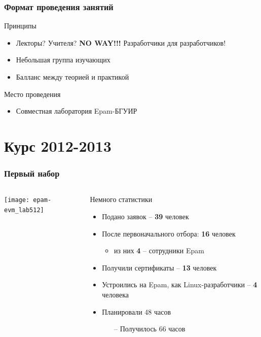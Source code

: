 \begin{frame}
	\frametitle{Формат проведения занятий}

	\begin{block}{Принципы}
		\begin{itemize}
			\item Лекторы? Учителя? {\bf NO WAY!!!} \newline 
				Разработчики для разработчиков! 
			\item Небольшая группа изучающих
			\item Балланс между теорией и практикой
		\end{itemize}
	\end{block}

	\begin{block}{Место проведения}
		\begin{itemize}
			\item Совместная лаборатория Epam-БГУИР 
		\end{itemize}
	\end{block}

\end{frame}

\section[2012]{Курс 2012-2013}

\begin{frame}
  \frametitle{Первый набор}
  \begin{columns}
	\texttt{[image: epam-evm\_lab512]}

	\begin{block}{Немного статистики}
		\begin{itemize}
			\item Подано заявок -- {\bf 39} человек
			\item После первоначального отбора: {\bf 16} человек
				\begin{itemize}
					\item из них {\bf 4} -- сотрудники Epam
				\end{itemize}
			\item Получили сертификаты -- {\bf 13} человек
			\item Устроились на Epam, как Linux-разработчики -- {\bf 4} человека
            \item Планировали 48 часов
            \pause
			\begin{itemize}
    				\item[--] Получилось 66 часов
			\end{itemize}
		\end{itemize}
	\end{block}
  \end{columns}
\end{frame}

